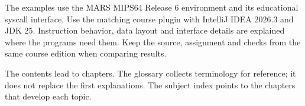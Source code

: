 The examples use the MARS MIPS64 Release 6 environment and its educational syscall
interface. Use the matching course plugin with IntelliJ IDEA 2026.3 and JDK 25.
Instruction behavior, data layout and interface details are explained where the
programs need them. Keep the source, assignment and checks from the same course
edition when comparing results.

The contents lead to chapters. The glossary collects terminology for reference;
it does not replace the first explanations. The subject index points to the
chapters that develop each topic.
